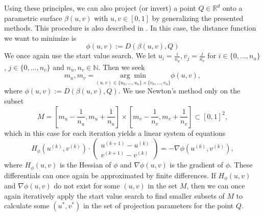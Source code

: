 \documentclass[a4paper, 11pt]{report}
\theoremstyle{definition}
\begin{document}
	Using these principles, we can also project (or invert) a point $Q \in \mathbb{R}^d$ onto a parametric surface $\beta(u,v)$ with $u,v \in [0,1]$ by generalizing the presented methods. This procedure is also described in \cite{Piegl1997}.
	In this case, the distance function we want to minimize is 
		$$ \phi(u,v) := D(\beta(u,v), Q)$$
	We once again use the start value search. We let $u_i = \frac{i}{n_u}, v_j = \frac{j}{n_v}$ for $i \in \{0, ..., n_u\}$, $j \in \{0,..., n_v\}$ and $n_u, n_v \in \mathbb{N}$. Then we seek
		$$ m_u, m_v = \underset{(u,v)\in\{u_0, ..., u_n\} \times \{v_0, ..., v_n\}}{\arg\min} \phi(u,v), $$
	where $\phi(u,v) := D(\beta(u,v), Q)$. We use Newton's method only on the subset
		$$  M = [m_u - \frac{1}{n_u}, m_u + \frac{1}{n_u}] \times [m_v - \frac{1}{n_v}, m_v + \frac{1}{n_v}] \subset [0,1]^2, $$
	which in this case for each iteration yields a linear system of equations
		$$ 	
			H_\phi
			\left(
					u^{(k)},
					v^{(k)}
			\right)
			\cdot
			\begin{pmatrix}
				u^{(k+1)} - u^{(k)} \\
				v^{(k+1)} - v^{(k)} 
			\end{pmatrix} 
			=
			-\nabla \phi
			\left(
					u^{(k)},
					v^{(k)}
			\right),
		$$
	where $H_\phi(u,v)$ is the Hessian of $\phi$ and $\nabla \phi(u,v)$ is the gradient of $\phi$. These differentials can once again be approximated by finite differences. If $H_\phi(u,v)$ and $\nabla \phi(u,v)$ do not exist for some $(u,v)$ in the set $M$, then we can once again iteratively apply the start value search to find smaller subsets of $M$ to calculate some $(u^*, v^*)$ in the set of projection parameters for the point $Q$.
\end{document}
